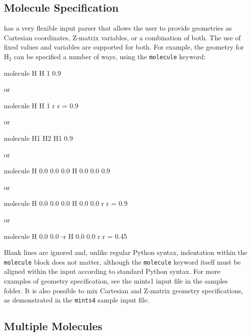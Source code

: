 \subsection{Molecule Specification}
\PSIfour has a very flexible input parser that allows the user to provide
geometries as Cartesian coordinates, Z-matrix variables, or a combination of
both. The use of fixed values and variables are supported for both. For
example, the geometry for H$_2$ can be specified a number of ways, using the
{\tt molecule} keyword:
\begin{Snippet}
molecule{
  H
  H 1 0.9
}

 or

molecule{
  H
  H 1 r
  r = 0.9
}

 or

molecule{
  H1
  H2 H1 0.9
}

 or

molecule{
  H 0.0 0.0 0.0
  H 0.0 0.0 0.9
}

 or

molecule{
  H 0.0 0.0 0.0
  H 0.0 0.0 r
  r = 0.9
}

 or

molecule{
  H 0.0 0.0 -r
  H 0.0 0.0 r
  r = 0.45
}
\end{Snippet}
Blank lines are ignored and, unlike regular Python syntax, indentation within
the {\tt molecule} block does not matter, although the {\tt molecule} keyword itself must
be aligned within the input according to standard Python syntax. For more
examples of geometry specification, see the mints1 input file in the samples
folder. It is also possible to mix Cartesian and Z-matrix geometry
specifications, as demonstrated in the {\tt mints4} sample input file.

\subsection{Multiple Molecules}

